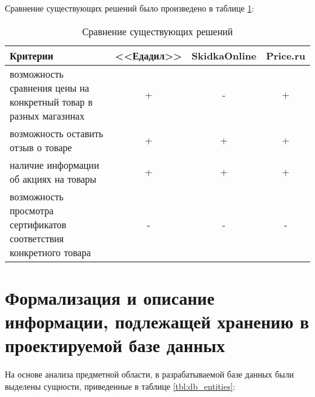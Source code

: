Сравнение существующих решений было произведено в таблице \ref{tbl:exist_sol}:

\begin{table}[!h]
	\begin{center}
		\begin{threeparttable}
			\caption{Сравнение существующих решений}
			\label{tbl:exist_sol}
			\begin{tabular}{|p{7cm}|c|c|c|}
				\hline
				\textbf{Критерии} & <<Едадил>> & SkidkaOnline & Price.ru \\
				\hline
				возможность сравнения цены на конкретный товар в разных магазинах & + & - & + \\
				\hline
				возможность оставить отзыв о товаре & + & + & + \\
				\hline
				наличие информации об акциях на товары & + & + & + \\
				\hline
				возможность просмотра сертификатов соответствия конкретного товара & - & - & - \\
				\hline
			\end{tabular}
		\end{threeparttable}			
	\end{center}
\end{table}

\clearpage 

\section{Формализация и описание информации, подлежащей хранению в проектируемой базе данных}

На основе анализа предметной области, в разрабатываемой базе данных были выделены сущности, приведенные в таблице \ref{tbl:db_entities}: 

